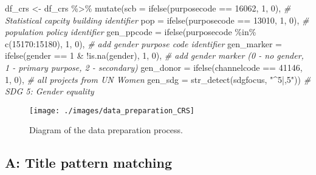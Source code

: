 \documentclass[
]{article}
\newenvironment{Shaded}{\begin{snugshade}}{\end{snugshade}}
\newcommand{\AttributeTok}[1]{\textcolor[rgb]{0.77,0.63,0.00}{#1}}
\newcommand{\CommentTok}[1]{\textcolor[rgb]{0.56,0.35,0.01}{\textit{#1}}}
\newcommand{\DecValTok}[1]{\textcolor[rgb]{0.00,0.00,0.81}{#1}}
\newcommand{\FunctionTok}[1]{\textcolor[rgb]{0.00,0.00,0.00}{#1}}
\newcommand{\NormalTok}[1]{#1}
\newcommand{\OtherTok}[1]{\textcolor[rgb]{0.56,0.35,0.01}{#1}}
\newcommand{\SpecialCharTok}[1]{\textcolor[rgb]{0.00,0.00,0.00}{#1}}
\newcommand{\StringTok}[1]{\textcolor[rgb]{0.31,0.60,0.02}{#1}}
\begin{document}
\begin{enumerate}
\begin{enumerate}
\begin{Shaded}
\begin{Highlighting}[]
\NormalTok{df\_crs }\OtherTok{\textless{}{-}}\NormalTok{ df\_crs }\SpecialCharTok{\%\textgreater{}\%}
  \FunctionTok{mutate}\NormalTok{(}\AttributeTok{scb =} \FunctionTok{ifelse}\NormalTok{(purposecode }\SpecialCharTok{==} \DecValTok{16062}\NormalTok{, }\DecValTok{1}\NormalTok{, }\DecValTok{0}\NormalTok{), }\CommentTok{\# Statistical capcity building identifier}
         \AttributeTok{pop =} \FunctionTok{ifelse}\NormalTok{(purposecode }\SpecialCharTok{==} \DecValTok{13010}\NormalTok{, }\DecValTok{1}\NormalTok{, }\DecValTok{0}\NormalTok{), }\CommentTok{\# population policy identifier}
         \AttributeTok{gen\_ppcode =} \FunctionTok{ifelse}\NormalTok{(purposecode }\SpecialCharTok{\%in\%} \FunctionTok{c}\NormalTok{(}\DecValTok{15170}\SpecialCharTok{:}\DecValTok{15180}\NormalTok{), }\DecValTok{1}\NormalTok{, }\DecValTok{0}\NormalTok{), }\CommentTok{\# add gender purpose code identifier}
         \AttributeTok{gen\_marker =} \FunctionTok{ifelse}\NormalTok{(gender }\SpecialCharTok{==} \DecValTok{1} \SpecialCharTok{\&} \SpecialCharTok{!}\FunctionTok{is.na}\NormalTok{(gender), }\DecValTok{1}\NormalTok{, }\DecValTok{0}\NormalTok{), }\CommentTok{\# add gender marker (0 {-} no gender, 1 {-} primary purpose, 2 {-} secondary)}
         \AttributeTok{gen\_donor =} \FunctionTok{ifelse}\NormalTok{(channelcode }\SpecialCharTok{==} \DecValTok{41146}\NormalTok{, }\DecValTok{1}\NormalTok{, }\DecValTok{0}\NormalTok{), }\CommentTok{\# all projects from UN Women}
         \AttributeTok{gen\_sdg =} \FunctionTok{str\_detect}\NormalTok{(sdgfocus, }\StringTok{"\^{}5|,5"}\NormalTok{)) }\CommentTok{\# SDG 5: Gender equality}
\end{Highlighting}
\end{Shaded}
  \end{enumerate}
\end{enumerate}

\begin{figure}

{\centering \texttt{[image: ./images/data\_preparation\_CRS]} 

}

\caption{Diagram of the data preparation process.}\label{fig:data-preparation-CRS}
\end{figure}

\hypertarget{a-title-pattern-matching}{%
\subsection{\texorpdfstring{\textbf{A}: Title pattern matching}{A: Title pattern matching}}\label{a-title-pattern-matching}}
\end{document}

